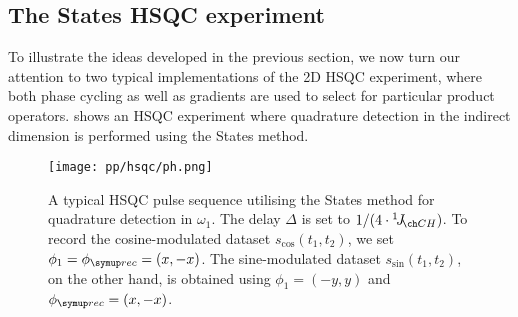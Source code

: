 \subsection{The States HSQC experiment}
\label{subsec:theory__hsqc_states}

To illustrate the ideas developed in the previous section, we now turn our attention to two typical implementations of the 2D HSQC experiment, where both phase cycling as well as gradients are used to select for particular product operators.
 shows an HSQC experiment where quadrature detection in the indirect dimension is performed using the States method.

\begin{figure}[htbp]
    \centering
    \texttt{[image: pp/hsqc/ph.png]}%
    \caption[Phase-sensitive HSQC pulse sequence with States method]{
        A typical HSQC pulse sequence utilising the States method for quadrature detection in $\omega_1$.
        The delay $\Delta$ is set to $1/(4 \cdot \oneJ{CH})$.
        To record the cosine-modulated dataset $s_\text{cos}(t_1, t_2)$, we set $\phi_1 = \phirec = (x, -x)$.
        The sine-modulated dataset $s_\text{sin}(t_1, t_2)$, on the other hand, is obtained using $\phi_1 = (-y, y)$ and $\phirec = (x, -x)$.
    }
    \label{fig:hsqc_ph}
\end{figure}

